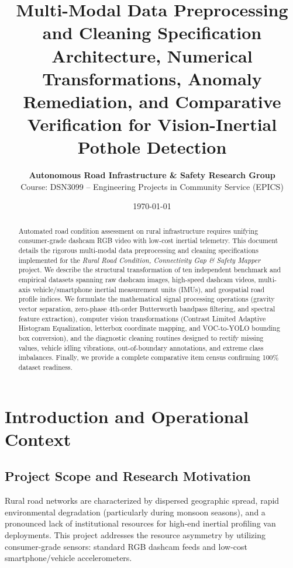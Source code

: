 \documentclass[11pt,a4paper]{article}
\title{\textbf{\LARGE Multi-Modal Data Preprocessing and Cleaning Specification}\\
\large Architecture, Numerical Transformations, Anomaly Remediation, and Comparative Verification for Vision-Inertial Pothole Detection}
\author{\textbf{Autonomous Road Infrastructure \& Safety Research Group} \\
Course: DSN3099 -- Engineering Projects in Community Service (EPICS)}
\date{\today}
\begin{document}
\maketitle

\begin{abstract}
Automated road condition assessment on rural infrastructure requires unifying consumer-grade dashcam RGB video with low-cost inertial telemetry. This document details the rigorous multi-modal data preprocessing and cleaning specifications implemented for the \textit{Rural Road Condition, Connectivity Gap \& Safety Mapper} project. We describe the structural transformation of ten independent benchmark and empirical datasets spanning raw dashcam images, high-speed dashcam videos, multi-axis vehicle/smartphone inertial measurement units (IMUs), and geospatial road profile indices. We formulate the mathematical signal processing operations (gravity vector separation, zero-phase 4th-order Butterworth bandpass filtering, and spectral feature extraction), computer vision transformations (Contrast Limited Adaptive Histogram Equalization, letterbox coordinate mapping, and VOC-to-YOLO bounding box conversion), and the diagnostic cleaning routines designed to rectify missing values, vehicle idling vibrations, out-of-boundary annotations, and extreme class imbalances. Finally, we provide a complete comparative item census confirming 100\% dataset readiness.
\end{abstract}

\tableofcontents
\newpage

\section{Introduction and Operational Context}

\subsection{Project Scope and Research Motivation}
Rural road networks are characterized by dispersed geographic spread, rapid environmental degradation (particularly during monsoon seasons), and a pronounced lack of institutional resources for high-end inertial profiling van deployments. This project addresses the resource asymmetry by utilizing consumer-grade sensors: standard RGB dashcam feeds and low-cost smartphone/vehicle accelerometers. 
\end{document}
